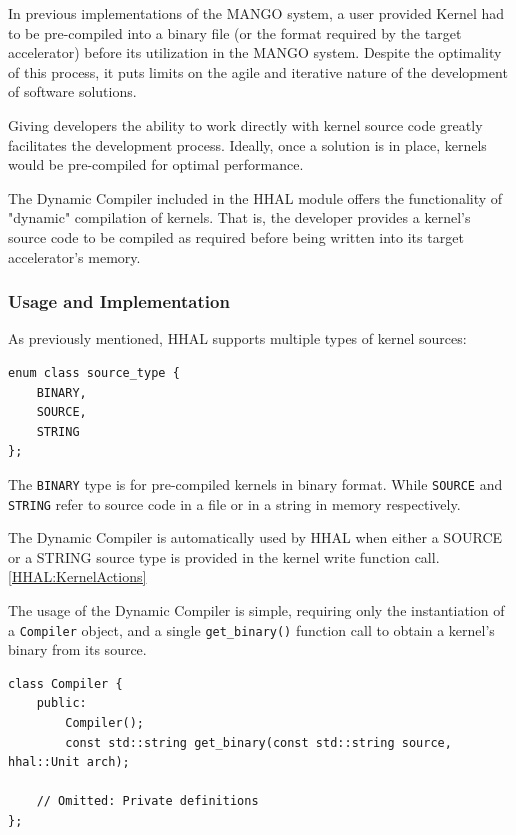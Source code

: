 In previous implementations of the MANGO system, a user provided Kernel had to be pre-compiled into a binary file (or the format required by the target accelerator) before its utilization in the MANGO system. Despite the optimality of this process, it puts limits on the agile and iterative nature of the development of software solutions.

Giving developers the ability to work directly with kernel source code greatly facilitates the development process. Ideally, once a solution is in place, kernels would be pre-compiled for optimal performance.

The Dynamic Compiler included in the HHAL module offers the functionality of "dynamic" compilation of kernels. That is, the developer provides a kernel's source code to be compiled as required before being written into its target accelerator's memory.

\subsubsection{Usage and Implementation}

As previously mentioned, HHAL supports multiple types of kernel sources: 

\begin{lstlisting}[style=CStyle, caption=HHAL API - Kernel source types]
enum class source_type {
    BINARY,
    SOURCE,
    STRING
};
\end{lstlisting}

The \texttt{BINARY} type is for pre-compiled kernels in binary format. While \texttt{SOURCE} and \texttt{STRING} refer to source code in a file or in a string in memory respectively.

The Dynamic Compiler is automatically used by HHAL when either a SOURCE or a STRING source type is provided in the kernel write function call. \ref{HHAL:KernelActions}

The usage of the Dynamic Compiler is simple, requiring only the instantiation of a \texttt{Compiler} object, and a single \texttt{get\_binary()} function call to obtain a kernel's binary from its source.

\begin{lstlisting}[style=CStyle, caption=HHAL Dynamic Compiler - Compiler class]
class Compiler {
    public:
        Compiler();
        const std::string get_binary(const std::string source, hhal::Unit arch);

    // Omitted: Private definitions
};
\end{lstlisting}


